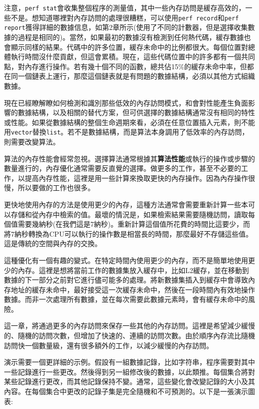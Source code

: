 注意，\texttt{perf stat}會收集整個程序的測量值，其中一些內存訪問是緩存高效的，一些不是。想知道哪裡對內存訪問的處理很糟糕，可以使用\texttt{perf record}和\texttt{perf report}獲得詳細的數據信息，如第2章所示(使用了不同的計數器，但是選擇收集數據的過程是相同的)。當然，如果最初的數據沒有檢測到任何熱代碼，緩存數據也會顯示同樣的結果。代碼中的許多位置，緩存未命中的比例都很大。每個位置對總體執行時間沒什麼貢獻，但這會累積。現在，這些代碼位置中的許多都有一個共同點，對內存進行操作。若有幾十個不同的函數，總共佔15\%的緩存未命中率，但都在同一個鏈表上運行，那麼這個鏈表就是有問題的數據結構，必須以其他方式組織數據。

現在已經瞭解瞭如何檢測和識別那些低效的內存訪問模式，和會對性能產生負面影響的數據結構，以及相關的替代方案，但可供選擇的數據結構通常沒有相同的特性或性能。如果從數據結構的整個生命週期來看，必須在任意位置插入元素，則不能用\texttt{vector}替換\texttt{list}。若不是數據結構，而是算法本身調用了低效率的內存訪問，則需要改變算法。


算法的內存性能會經常忽視。選擇算法通常根據其\textbf{算法性能}或執行的操作或步驟的數量進行的，內存優化通常需要反直覺的選擇。做更多的工作，甚至不必要的工作，以提高內存性能，這裡是用一些計算來換取更快的內存操作。因為內存操作很慢，所以要做的工作也很多。

更快地使用內存的方法是使用更少的內存，這種方法通常會需要重新計算一些本可以存儲和從內存中檢索的值。最壞的情況是，如果檢索結果需要隨機訪問，讀取每個值需要幾納秒(在我們這是7納秒)。重新計算這個值所花費的時間比這要少，而將7納秒轉換為CPU可以執行的操作數是相當長的時間，那麼最好不存儲這些值。這是傳統的空間與內存的交換。

這種優化有一個有趣的變式。在特定時間內使用更少的內存，而不是簡單地使用更少的內存。這裡是想將當前工作的數據集放入緩存中，比如L2緩存，並在移動到數據的下一部分之前對它進行儘可能多的處理。將新數據集插入到緩存中會導致內存地址的緩存未命中，最好接受這一次緩存未命中，然後在一段時間內有效地操作數據。而非一次處理所有數據，並在每次需要此數據元素時，會有緩存未命中的風險。

這一章，將通過更多的內存訪問來保存一些其他的內存訪問。這裡是希望減少緩慢的、隨機的訪問次數，但增加了快速的、連續的訪問次數。由於順序內存流比隨機訪問快一個數量級，還有很多額外的工作，以減少緩慢的內存訪問。

演示需要一個更詳細的示例。假設有一組數據記錄，比如字符串，程序需要對其中一些記錄進行一些更改。然後得到另一組修改後的數據，以此類推。每個集合將對某些記錄進行更改，而其他記錄保持不變。通常，這些變化會改變記錄的大小及其內容。在每個集合中更改的記錄子集是完全隨機和不可預測的。以下是一張演示圖表:

